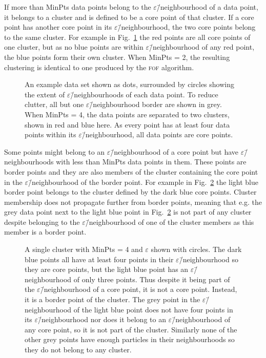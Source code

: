 \documentclass[english, oneside]{HYgradu}
\begin{document}
If more than MinPts data points belong to the $\varepsilon$\=/neighbourhood of a data point, it belongs to a cluster and is defined to be a core point of that cluster. If a core point has another core point in its $\varepsilon$\=/neighbourhood, the two core points belong to the same cluster. For example in Fig.\ \ref{fig:DBSCAN-twocores} the red points are all core points of one cluster, but as no blue points are within $\varepsilon$\=/neighbourhood of any red point, the blue points form their own cluster. When MinPts = 2, the resulting clustering is identical to one produced by the \textsc{fof} algorithm.

\begin{figure}
    \centering
    
    \caption{An example data set shown as dots, surrounded by circles showing the extent of $\varepsilon$\=/neighbourhoods of each data point. To reduce clutter, all but one $\varepsilon$\=/neighbourhood border are shown in grey. When MinPts = 4, the data points are separated to two clusters, shown in red and blue here. As every point has at least four data points within its $\varepsilon$\=/neighbourhood, all data points are core points.}\label{fig:DBSCAN-twocores}
\end{figure}

Some points might belong to an $\varepsilon$\=/neighbourhood of a core point but have $\varepsilon$\=/neighbourhoods with less than MinPts data points in them. These points are border points and they are also members of the cluster containing the core point in the $\varepsilon$\=/neighbourhood of the border point. For example in Fig.\ \ref{fig:DBSCAN-borderpoint} the light blue border point belongs to the cluster defined by the dark blue core points. Cluster membership does not propagate further from border points, meaning that e.g. the grey data point next to the light blue point in Fig.\ \ref{fig:DBSCAN-borderpoint} is not part of any cluster despite belonging to the $\varepsilon$\=/neighbourhood of one of the cluster members as this member is a border point.

\begin{figure}
    \centering
    
    \caption{A single cluster with MinPts = 4 and $\varepsilon$ shown with circles. The dark blue points all have at least four points in their $\varepsilon$\=/neighbourhood so they are core points, but the light blue point has an $\varepsilon$\=/neighbourhood of only three points. Thus despite it being part of the $\varepsilon$\=/neighbourhood of a core point, it is not a core point. Instead, it is a border point of the cluster. The grey point in the $\varepsilon$\=/neighbourhood of the light blue point does not have four points in its $\varepsilon$\=/neighbourhood nor does it belong to an $\varepsilon$\=/neighbourhood of any core point, so it is not part of the cluster. Similarly none of the other grey points have enough particles in their neighbourhoods so they do not belong to any cluster.}\label{fig:DBSCAN-borderpoint}
\end{figure}
\end{document}
